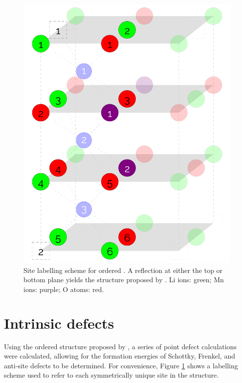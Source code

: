 \newpage
\begin{figure}[h]
\centering
\includegraphics[height = 0.5\textheight]{figures/orderedlabels/orderedlabels}
\caption[Site labelling scheme for ordered ]{Site labelling scheme for ordered . A reflection at either the top or bottom plane yields the structure proposed by \citet{Diaz-Lopez2017}. Li ions: green; Mn ions: purple; O atoms: red.
}
\label{fig:orderedlabel}
\end{figure}

\section{Intrinsic defects}
Using the ordered structure proposed by \citet{Diaz-Lopez2017}, a series of point defect calculations were calculated, allowing for the formation energies of Schottky, Frenkel, and anti-site defects to be determined.
For convenience, Figure \ref{fig:orderedlabel} shows a labelling scheme used to refer to each symmetrically unique site in the structure.

